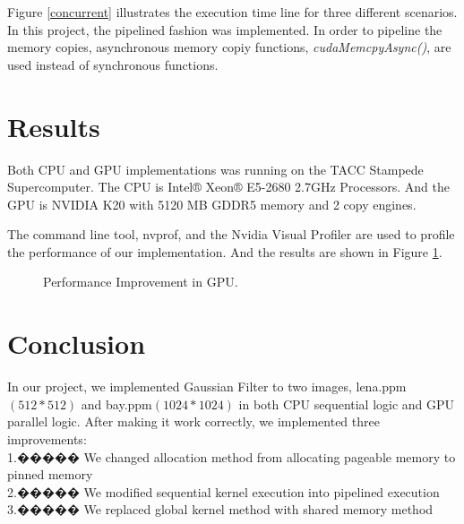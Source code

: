 \documentclass[journal,11pt,onecolumn,draftclsnofoot]{ieeeconf}  %
\begin{document}
Figure \ref{concurrent} illustrates the execution time line for three different scenarios. In this project, the pipelined fashion was implemented. In order to pipeline the memory copies, asynchronous memory copiy functions, \textit{cudaMemcpyAsync()}, are used instead of synchronous functions.\cite{Stream} \par

\section{Results}
Both CPU and GPU implementations was running on the TACC Stampede Supercomputer. The CPU is Intel® Xeon® E5-2680 2.7GHz Processors. And the GPU is NVIDIA K20 with 5120 MB GDDR5 memory and 2 copy engines. \par
The command line tool, nvprof, and the Nvidia Visual Profiler are used to profile the performance of our implementation. And the results are shown in Figure \ref{performances}.

\begin{figure}[h]
	\centering
	\caption{Performance Improvement in GPU.}
	\label{performances}
\end{figure}

\section{Conclusion} 
In our project, we implemented Gaussian Filter to two images, lena.ppm$(512*512)$ and bay.ppm$(1024*1024)$ in both CPU sequential logic and GPU parallel logic. After making it work correctly, we implemented three improvements:  \\
1.����� We changed allocation method from allocating pageable memory to pinned memory \\
2.����� We modified sequential kernel execution into pipelined execution \\
3.����� We replaced global kernel method with shared memory method \\
\end{document}
